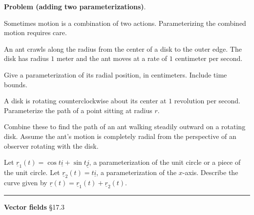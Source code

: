 \documentclass[12pt,letterpaper,noanswers]{exam}
\newcommand{\mb}[1]{\underline{#1}}
\begin{document}
\noindent\textbf{Problem (adding two parameterizations)}.
\begin{questions}

\item
Sometimes motion is a combination of two actions.  Parameterizing the combined motion requires care.
\begin{parts}
\item An ant crawls along the radius from the center of a disk to the outer edge.  The disk has radius $1$ meter and the ant moves at a rate of $1$ centimeter per second.  

Give a parameterization of its radial position, in centimeters.  Include time bounds.

\vfill
\item A disk is rotating counterclockwise about its center at $1$ revolution per second.  Parameterize the path of a point sitting at radius $r$.

\vfill
\item Combine these to find the path of an ant walking steadily outward on a rotating disk.  Assume the ant's motion is completely radial from the perspective of an observer rotating with the disk.

\vfill
\end{parts}

\item

Let $\mb r_1(t) = \cos t\mb i + \sin t\mb j$, a parameterization of the unit circle or a piece of the unit circle.  Let $\mb r_2(t) = t\mb i$, a parameterization of the $x$-axis.  Describe the curve given by $\mb r(t) = \mb r_1(t) + \mb r_2(t)$.
\vfill


\end{questions}



\vspace{0.2cm}
\hrule
\vspace{0.2cm}

\noindent\textbf{Vector fields} \S 17.3
\end{document}
